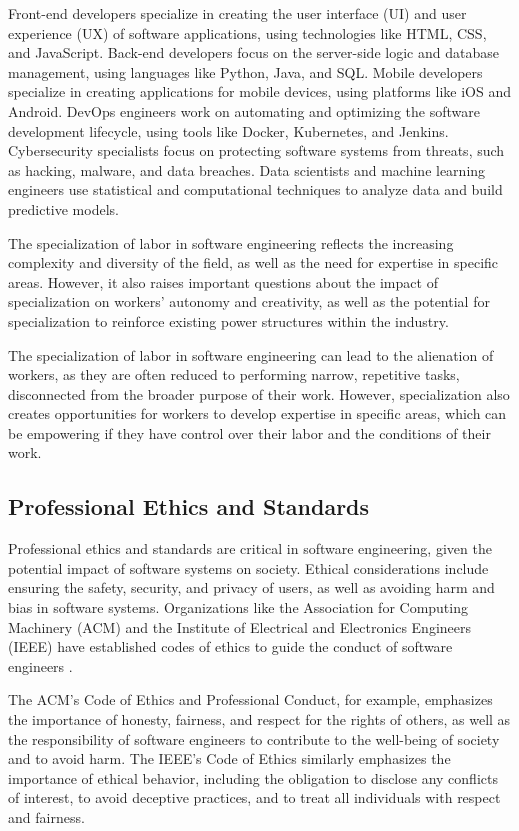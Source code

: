 \begin{refsection}
\begin{multicols}{2}
{Front-end developers specialize in creating the user interface (UI) and user experience (UX) of software applications, using technologies like HTML, CSS, and JavaScript. Back-end developers focus on the server-side logic and database management, using languages like Python, Java, and SQL. Mobile developers specialize in creating applications for mobile devices, using platforms like iOS and Android. DevOps engineers work on automating and optimizing the software development lifecycle, using tools like Docker, Kubernetes, and Jenkins. Cybersecurity specialists focus on protecting software systems from threats, such as hacking, malware, and data breaches. Data scientists and machine learning engineers use statistical and computational techniques to analyze data and build predictive models.

The specialization of labor in software engineering reflects the increasing complexity and diversity of the field, as well as the need for expertise in specific areas. However, it also raises important questions about the impact of specialization on workers' autonomy and creativity, as well as the potential for specialization to reinforce existing power structures within the industry.

The specialization of labor in software engineering can lead to the alienation of workers, as they are often reduced to performing narrow, repetitive tasks, disconnected from the broader purpose of their work. However, specialization also creates opportunities for workers to develop expertise in specific areas, which can be empowering if they have control over their labor and the conditions of their work.

\subsection{Professional Ethics and Standards}

Professional ethics and standards are critical in software engineering, given the potential impact of software systems on society. Ethical considerations include ensuring the safety, security, and privacy of users, as well as avoiding harm and bias in software systems. Organizations like the Association for Computing Machinery (ACM) and the Institute of Electrical and Electronics Engineers (IEEE) have established codes of ethics to guide the conduct of software engineers \cite[p. 3]{quinn2020}.

The ACM's Code of Ethics and Professional Conduct, for example, emphasizes the importance of honesty, fairness, and respect for the rights of others, as well as the responsibility of software engineers to contribute to the well-being of society and to avoid harm. The IEEE's Code of Ethics similarly emphasizes the importance of ethical behavior, including the obligation to disclose any conflicts of interest, to avoid deceptive practices, and to treat all individuals with respect and fairness.

}
\end{multicols}
\end{refsection}
